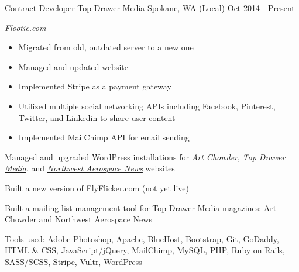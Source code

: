 \begin{cventries}
  \cventry
    {Contract Developer} %
    {Top Drawer Media} %
    {Spokane, WA (Local)} %
    {Oct 2014 - Present} %
    {
      \begin{cvitems} %
        \item {\emph{\href{https://flootie.com/}{Flootie.com}}}
        \begin{itemize}
          \item {Migrated from old, outdated server to a new one}
          \item {Managed and updated website}
          \item {Implemented Stripe as a payment gateway}
          \item {Utilized multiple social networking APIs including Facebook, Pinterest, Twitter, and Linkedin to share user content}
          \item {Implemented MailChimp API for email sending}
        \end{itemize}
        \item {Managed and upgraded WordPress installations for \emph{\href{http://artchowder.com/}{Art Chowder}}, \emph{\href{http://topdrawermedia.com/}{Top Drawer Media}}, and \emph{\href{http://northwestaerospacenews.com/}{Northwest Aerospace News}} websites}
        \item {Built a new version of FlyFlicker.com (not yet live)}
        \item {Built a mailing list management tool for Top Drawer Media magazines: Art Chowder and Northwest Aerospace News}
        \item {Tools used: Adobe Photoshop, Apache, BlueHost, Bootstrap, Git, GoDaddy, HTML \& CSS, JavaScript/jQuery, MailChimp, MySQL, PHP, Ruby on Rails, SASS/SCSS, Stripe, Vultr, WordPress}
      \end{cvitems}
    }


\end{cventries}
